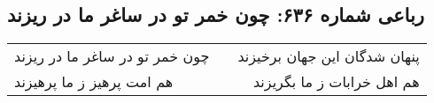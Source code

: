 \begin{center}
\section*{رباعی شماره ۶۳۶: چون خمر تو در ساغر ما در ریزند}
\label{sec:0636}
\begin{longtable}{l p{0.5cm} r}
چون خمر تو در ساغر ما در ریزند
&&
پنهان شدگان این جهان برخیزند
\\
هم امت پرهیز ز ما پرهیزند
&&
هم اهل خرابات ز ما بگریزند
\\
\end{longtable}
\end{center}
